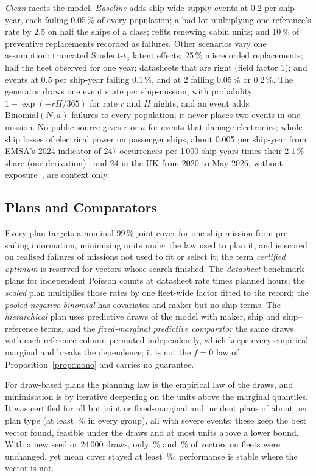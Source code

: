 \emph{Clean} meets the model. \emph{Baseline} adds ship-wide supply events at
0.2 per ship-year, each failing 0.05\,\% of every population; a bad lot
multiplying one reference's rate by 2.5 on half the ships of a class; refits
renewing cabin units; and 10\,\% of preventive replacements recorded as
failures. Other scenarios vary one assumption: truncated Student-$t_3$ latent effects;
25\,\% misrecorded replacements; half the fleet observed for one year;
datasheets that are right (field factor 1); and events at 0.5 per ship-year
failing 0.1\,\%, and at 2 failing 0.05\,\% or 0.2\,\%. The generator draws one
event state per ship-mission, with probability $1-\exp(-rH/365)$ for rate $r$
and $H$ nights, and an event adds $\mathrm{Binomial}(N,a)$ failures to every
population; it never places two events in one mission. No public source gives
$r$ or $a$ for events that damage electronics; whole-ship losses of electrical
power on passenger ships, about 0.005 per ship-year from EMSA's 2024 indicator
of 247 occurrences per 1\,000 ship-years times their 2.1\,\% share (our
derivation)~\cite{emsa2025} and 24 in the UK from 2020 to May 2026, without
exposure~\cite{maib_portal}, are context only.

\subsection{Plans and Comparators}
Every plan targets a nominal 99\,\% joint cover for one ship-mission from
pre-sailing information, minimising units under the law used to plan it, and
is scored on realised failures of missions not used to fit or select it; the
term \emph{certified optimum} is reserved for vectors whose search finished.
The \emph{datasheet} benchmark plans for independent Poisson
counts at datasheet rate times planned hours; the \emph{scaled} plan
multiplies those rates by one fleet-wide factor fitted to the record; the
\emph{pooled negative binomial} has covariates and maker but no ship terms.
The \emph{hierarchical} plan uses \brDraws{} predictive draws of the model with
maker, ship and ship--reference terms, and the \emph{fixed-marginal predictive
comparator} the same draws with each reference column permuted independently,
which keeps every empirical marginal and breaks the dependence; it is not the
$f=0$ law of Proposition~\ref{prop:mono} and carries no guarantee.

For draw-based plans the planning law is the empirical law of the draws, and
minimisation is by iterative deepening on the units above the marginal
quantiles. It was certified for all but \fdNotCertJP{}
joint or fixed-marginal and \fdNotCertEv{} incident plans of about
\fdPlansPerType{} per plan type (at least \fdCert\,\% in every group), all
with severe events; these keep the best vector found, feasible under the draws
and at most \fdNotCertGap{} units above a lower bound. With a new seed or
24\,000 draws, only \fdStabSameSeed\,\% and \fdStabSameBig\,\% of vectors on
\fdStabFleets{} fleets were unchanged, yet mean cover stayed at least
\fdStabFresh\,\%: performance is stable where the vector is not.

